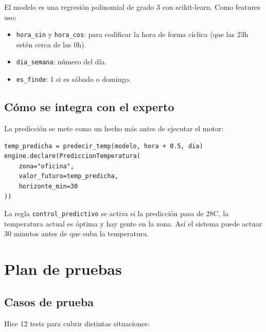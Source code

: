 \documentclass[12pt,a4paper]{article}
\begin{document}
El modelo es una regresi\'on polinomial de grado 3 con scikit-learn. Como features uso:
\begin{itemize}
    \item \texttt{hora\_sin} y \texttt{hora\_cos}: para codificar la hora de forma c\'iclica (que las 23h est\'en cerca de las 0h).
    \item \texttt{dia\_semana}: n\'umero del d\'ia.
    \item \texttt{es\_finde}: 1 si es s\'abado o domingo.
\end{itemize}

\subsection{C\'omo se integra con el experto}

La predicci\'on se mete como un hecho m\'as antes de ejecutar el motor:

\begin{lstlisting}
temp_predicha = predecir_temp(modelo, hora + 0.5, dia)
engine.declare(PrediccionTemperatura(
    zona="oficina",
    valor_futuro=temp_predicha,
    horizonte_min=30
))
\end{lstlisting}

La regla \texttt{control\_predictivo} se activa si la predicci\'on pasa de 28\textdegree C, la temperatura actual es \'optima y hay gente en la zona. As\'i el sistema puede actuar 30 minutos antes de que suba la temperatura.

\newpage
\section{Plan de pruebas}

\subsection{Casos de prueba}

Hice 12 tests para cubrir distintas situaciones:
\end{document}
